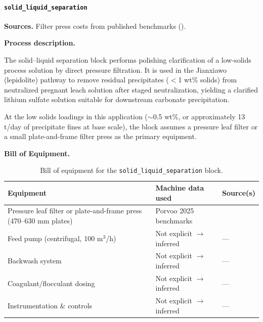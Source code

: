 \clearpage
\paragraph{\texttt{solid\_liquid\_separation}}\label{app:04-methods-blockdefs-sls}

\medskip
\noindent\textbf{Sources.}\quad
Filter press costs from published benchmarks (\citet{porvooIndustrialFilterPress2025}). 

\medskip
\noindent\textbf{Process description.}\quad

The solid--liquid separation block performs polishing clarification of a low-solids process solution by direct pressure filtration. It is used in the Jianxiawo (lepidolite) pathway to remove residual precipitates ($<$1 wt\% solids) from neutralized pregnant leach solution after staged neutralization, yielding a clarified lithium sulfate solution suitable for downstream carbonate precipitation.

At the low solids loadings in this application ($\sim$0.5 wt\%, or approximately 13 t/day of precipitate fines at base scale), the block assumes a pressure leaf filter or a small plate-and-frame filter press as the primary equipment.

\medskip
\noindent\textbf{Bill of Equipment.}\quad

\begin{table}[h!]
\caption{Bill of equipment for the \texttt{solid\_liquid\_separation} block.}
\centering
\begin{tabular}{>{\raggedright\arraybackslash}p{5.2cm}
				>{\raggedright\arraybackslash}p{4cm}
				>{\raggedright\arraybackslash}p{4.5cm}}
\toprule
\textbf{Equipment} & \textbf{Machine data used} & \textbf{Source(s)} \\
\midrule
Pressure leaf filter or plate-and-frame press (470--630 mm plates) & Porvoo 2025 benchmarks & \citet{porvooIndustrialFilterPress2025} \\
Feed pump (centrifugal, 100 m$^3$/h) & Not explicit $\rightarrow$ inferred & --- \\
Backwash system & Not explicit $\rightarrow$ inferred & --- \\
Coagulant/flocculant dosing & Not explicit $\rightarrow$ inferred & --- \\
Instrumentation \& controls & Not explicit $\rightarrow$ inferred & --- \\
\bottomrule
\end{tabular}
\end{table}

